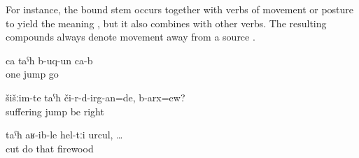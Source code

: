 For instance, the bound stem  occurs together with verbs of movement or posture to yield the meaning , but it also combines with other verbs. The resulting compounds always denote movement away from a source .
%
\begin{exe}
	\ex	\label{ex:One (boar) jumped (down)}
	\gll	ca	taˁħ	b-uq-un	ca-b\\
		one	jump	go	\\
	\glt	{}

	\ex	\label{ex:I would distract from the sorrows, right}
	\gll	šišːim-te	taˁħ	či-r-d-irg-an=de,	b-arx=ew?\\
		suffering	jump	be	right\\
	\glt	{}

	\ex	\label{ex:when (they) cut off the wood}
	\gll	taˁħ	aʁ-ib-le	hel-tːi	urcul,	\ldots\\
		cut	do	that	firewood\\
	\glt	{}
\end{exe}

